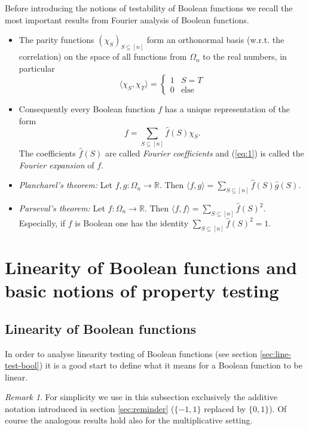 \documentclass[a4paper]{article}
\newcommand{\real}{\mathbb{R}}
\newcommand{\nset}{[n]}
\theoremstyle{plain}
\theoremstyle{definition}
\theoremstyle{remark}
\newtheorem*{remark*}{Remark}
\begin{document}
Before introducing the notions of testability of Boolean functions we
recall the most important results from Fourier analysis of Boolean
functions. 
\begin{itemize}
\item The parity functions \(\left(\chi_S\right)_{S \subseteq \nset}\)
  form an orthonormal basis (w.r.t. the correlation) on the space of all functions from  \(\Omega_n\) to the real numbers, in particular 
  \[\langle \chi_S, \chi_T\rangle =  \begin{cases}
    1 & S=T \\
    0 & \text{else}
  \end{cases}\]
\item Consequently every Boolean function \(f\) has a unique
  representation of the form 
  \begin{equation}
    \label{eq:1}
    f = \sum_{S\subseteq \nset} \hat{f}(S) \chi_S.
  \end{equation}
  The coefficients \(\hat{f}(S)\) are called \emph{Fourier
    coefficients} and (\ref{eq:1}) is called the \emph{Fourier
    expansion} of \(f\).
\item \emph{Plancharel's theorem:} Let \(f,g: \Omega_n \rightarrow
  \real\). Then \(\langle f, g\rangle = \sum_{S\subseteq \nset}
  \hat{f}(S)\hat{g}(S)\).
\item \emph{Parseval's theorem:} Let \(f: \Omega_n \rightarrow
  \real\). Then \(\langle f, f\rangle = \sum_{S\subseteq \nset}
  \hat{f}(S)^2\). Especially, if \(f\) is Boolean one has the identity \(\sum_{S\subseteq \nset}
  \hat{f}(S)^2 = 1\). 
\end{itemize}


\section{Linearity of Boolean functions and basic notions of property testing}
\label{sec:line-bool-funct}

\subsection{Linearity of Boolean functions}
\label{sec:line-bool-funct-1}

In order to analyse linearity testing of Boolean functions (see
section \ref{sec:line-test-bool}) it is a
good start to define what it means for a Boolean
function to be linear. \\ 

\begin{remark*}
For simplicity we use in this subsection exclusively the additive
notation introduced in section \ref{sec:reminder} (\(\{-1,1\}\)
replaced by \(\{0,1\}\)). Of course the
analogous results hold also for the multiplicative setting.  
\end{remark*}
\end{document}

